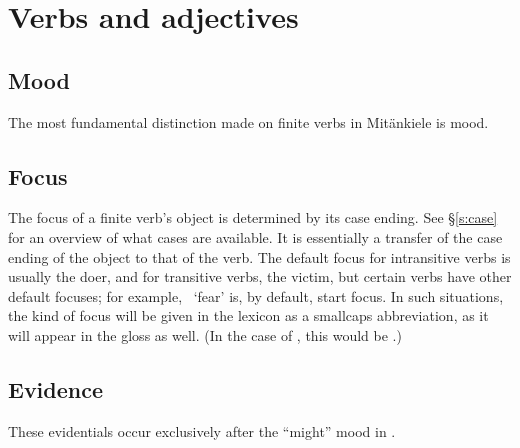 \chapter{Verbs and adjectives}
\section{Mood}
The most fundamental distinction made on finite verbs in Mit\"ankiele
is mood.

\section{Focus}
The focus of a finite verb's object is determined by its case ending. See
\S\ref{s:case} for an overview of what cases are available. It is essentially a
transfer of the case ending of the object to that of the verb. The default focus
for intransitive verbs is usually the doer, and for transitive verbs, the
victim, but certain verbs have other default focuses; for example,
~`fear' is, by default, start focus. In such situations, the kind of
focus will be given in the lexicon as a smallcaps abbreviation, as it will
appear in the gloss as well. (In the case of , this would be
.)

\section{Evidence}
These evidentials occur exclusively after the ``might'' mood in .


